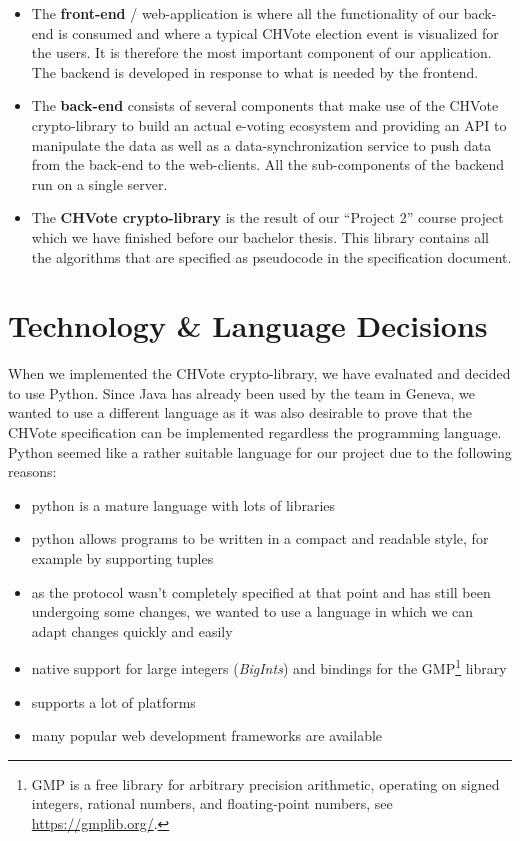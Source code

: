 \begin{itemize}
	\item The \textbf{front-end} / web-application is where all the functionality of our back-end is consumed and where a typical CHVote election event is visualized for the users. It is therefore the most important component of our application. The backend is developed in response to what is needed by the frontend.
	\item The \textbf{back-end} consists of several components that make use of the CHVote crypto-library to build an actual e-voting ecosystem and providing an API to manipulate the data as well as a data-synchronization service to push data from the back-end to the web-clients. All the sub-components of the backend run on a single server.
  \item The \textbf{CHVote crypto-library} is the result of our "`Project 2"' course project which we have finished before our bachelor thesis. This library contains all the algorithms that are specified as pseudocode in the specification document.
\end{itemize}

\section{Technology \& Language Decisions}
When we implemented the CHVote crypto-library, we have evaluated and decided to use Python. Since Java has already been used by the team in Geneva, we wanted to use a different language as it was also desirable to prove that the CHVote specification can be implemented regardless the programming language. Python seemed like a rather suitable language for our project due to the following reasons:
\begin{itemize}	
	\item python is a mature language with lots of libraries
	\item python allows programs to be written in a compact and readable style, for example by supporting tuples
	\item as the protocol wasn't completely specified at that point and has still been undergoing some changes, we wanted to use a language in which we can adapt changes quickly and easily
	\item native support for large integers (\textit{BigInts}) and bindings for the GMP\footnote{GMP is a free library for arbitrary precision arithmetic, operating on signed integers, rational numbers, and floating-point numbers, see \url{https://gmplib.org/}.} library
	\item supports a lot of platforms
	\item many popular web development frameworks are available
\end{itemize}

